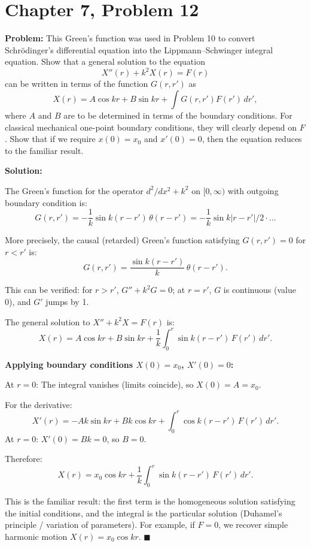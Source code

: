 \documentclass[12pt]{article}
\begin{document}
\section*{Chapter 7, Problem 12}

\textbf{Problem:} This Green's function was used in Problem 10 to convert Schr\"odinger's differential equation into the Lippmann--Schwinger integral equation. Show that a general solution to the equation
\[
X''(r) + k^2 X(r) = F(r)
\]
can be written in terms of the function $G(r,r')$ as
\[
X(r) = A\cos kr + B\sin kr + \int G(r,r')F(r')\,dr',
\]
where $A$ and $B$ are to be determined in terms of the boundary conditions. For classical mechanical one-point boundary conditions, they will clearly depend on $F$. Show that if we require $x(0) = x_0$ and $x'(0) = 0$, then the equation reduces to the familiar result.

\bigskip
\textbf{Solution:}

The Green's function for the operator $d^2/dx^2 + k^2$ on $[0,\infty)$ with outgoing boundary condition is:
\[
G(r,r') = -\frac{1}{k}\sin k(r - r')\,\theta(r-r') = -\frac{1}{k}\sin k|r-r'|/2 \cdot\ldots
\]

More precisely, the causal (retarded) Green's function satisfying $G(r,r')=0$ for $r < r'$ is:
\[
G(r,r') = \frac{\sin k(r-r')}{k}\,\theta(r-r').
\]

This can be verified: for $r > r'$, $G'' + k^2 G = 0$; at $r = r'$, $G$ is continuous (value 0), and $G'$ jumps by 1.

The general solution to $X'' + k^2 X = F(r)$ is:
\[
X(r) = A\cos kr + B\sin kr + \frac{1}{k}\int_0^r \sin k(r-r')\,F(r')\,dr'.
\]

\textbf{Applying boundary conditions $X(0) = x_0$, $X'(0) = 0$:}

At $r = 0$: The integral vanishes (limits coincide), so $X(0) = A = x_0$.

For the derivative:
\[
X'(r) = -Ak\sin kr + Bk\cos kr + \int_0^r \cos k(r-r')\,F(r')\,dr'.
\]
At $r = 0$: $X'(0) = Bk = 0$, so $B = 0$.

Therefore:
\[
X(r) = x_0\cos kr + \frac{1}{k}\int_0^r \sin k(r-r')\,F(r')\,dr'.
\]

This is the familiar result: the first term is the homogeneous solution satisfying the initial conditions, and the integral is the particular solution (Duhamel's principle / variation of parameters). For example, if $F = 0$, we recover simple harmonic motion $X(r) = x_0\cos kr$. $\blacksquare$
\end{document}
